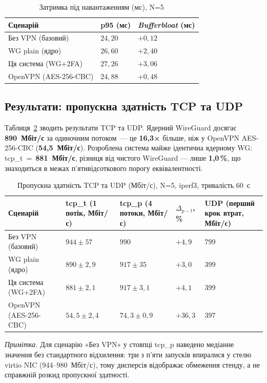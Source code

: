 \begin{table}[htbp]\centering
\caption{Затримка під навантаженням (мс), N=5}
\label{tab:perf_lat_load}
\begin{tabularx}{\textwidth}{|l|X|X|}\hline
\textbf{Сценарій} & \textbf{p95 (мс)} & \textbf{\textit{Bufferbloat} (мс)} \\\hline
Без VPN (базовий)     & $24{,}20$ & $+0{,}12$ \\\hline
WG plain (ядро)       & $26{,}60$ & $+2{,}40$ \\\hline
Ця система (WG+2FA)   & $27{,}26$ & $+3{,}06$ \\\hline
OpenVPN (AES-256-CBC) & $24{,}88$ & $+0{,}48$ \\\hline
\end{tabularx}\end{table}

\subsection{Результати: пропускна здатність TCP та UDP}
\label{subsec:perf_results_tput}

Таблиця~\ref{tab:perf_tcp} зводить результати TCP та UDP. Ядерний WireGuard
досягає \textbf{890~Мбіт/с} за одиночним потоком~--- це \textbf{16{,}3×}
більше, ніж у OpenVPN AES-256-CBC (\textbf{54{,}5~Мбіт/с}). Розроблена
система майже ідентична ядерному WG: tcp\_t~=~\textbf{881~Мбіт/с}, різниця
від чистого WireGuard --- лише \textbf{1{,}0\,\%}, що знаходиться в межах
п'ятивідсоткового порогу еквівалентності.

\begin{table}[htbp]\centering
\caption{Пропускна здатність TCP та UDP (Мбіт/с), N=5, iperf3, тривалість 60~с}
\label{tab:perf_tcp}
\begin{tabularx}{\textwidth}{|l|X|X|X|X|}\hline
\textbf{Сценарій}
  & \textbf{tcp\_t (1 потік, Мбіт/с)}
  & \textbf{tcp\_p (4 потоки, Мбіт/с)}
  & \textbf{$\Delta_{p-t}$,\,\%}
  & \textbf{UDP (перший крок втрат, Мбіт/с)} \\\hline
Без VPN (базовий)     & $944 \pm 57$  & $990$            & $+4{,}9$ & 799 \\\hline
WG plain (ядро)       & $890 \pm 2{,}9$ & $917 \pm 35$  & $+3{,}0$ & 399 \\\hline
Ця система (WG+2FA)   & $881 \pm 2{,}1$ & $917 \pm 3{,}1$ & $+4{,}1$ & 399 \\\hline
OpenVPN (AES-256-CBC) & $54{,}5 \pm 2{,}4$ & $74{,}3 \pm 0{,}9$ & $+36{,}3$ & 397 \\\hline
\end{tabularx}
\begin{minipage}{\textwidth}\small
\textit{Примітка.} Для сценарію «Без VPN» у стовпці tcp\_p наведено медіанне
значення без стандартного відхилення: три з п'яти запусків впиралися у стелю
virtio NIC (944--980~Мбіт/с), тому дисперсія відображає обмеження стенду,
а не справжній розкид пропускної здатності.
\end{minipage}
\end{table}

